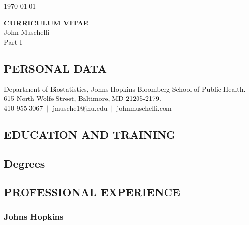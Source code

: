 \documentclass[10pt]{article}
\newcommand*{\cventry}[7][.25em]{}
\newcommand{\mydot}[1]{\begin{enumerate}[label=$\circ$,leftmargin=\parindent]\setlength{\itemsep}{#1}}
\newcommand{\ee}{\end{enumerate}}
\newcommand{\mylift}[1]{\vspace*{#1}}
\begin{document}
\hfill \today

\begin{center}
{\bf CURRICULUM VITAE}\\
John Muschelli\\[3mm]
Part I
\end{center}

\vspace*{10mm}

\subsection*{PERSONAL DATA}

Department of Biostatistics, Johns Hopkins Bloomberg School of Public Health.\\[0.2em]
615 North Wolfe Street, Baltimore, MD 21205-2179.\\[1em]
410-955-3067 $\ |\ $ jmusche1@jhu.edu $\ |\ $ johnmuschelli.com


\subsection*{EDUCATION AND TRAINING}

\smallskip

\subsection*{Degrees}

\mydot{-0.1em}


\ee

\mylift{-1.5em}

\subsection*{PROFESSIONAL EXPERIENCE}

\subsubsection*{Johns Hopkins}


\cventry{2020--Present}{Associate Scientist}{Department of Biostatistics}{Johns Hopkins Bloomberg School of Public Health}{(Research-track Faculty)}{}
\vspace{1em}

\cventry{2021--2023}{Chief Technical Officer}{}{Streamline Data Science}{\url{https://www.streamlinedatascience.io/}}{(Startup folded)}
\vspace{1em}
\end{document}
